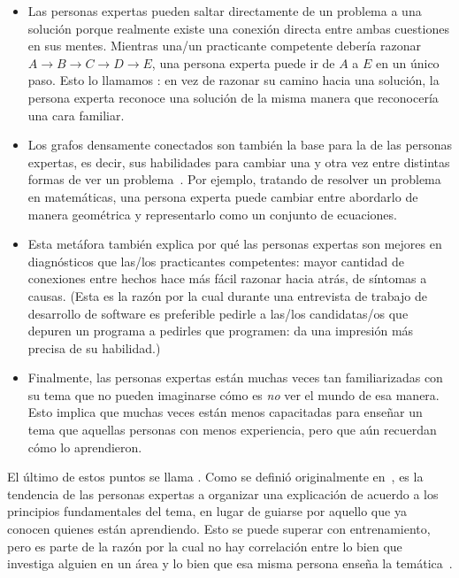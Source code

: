 \begin{itemize}

\item
  Las personas expertas pueden saltar directamente de un problema a una solución
  porque realmente existe una conexión directa entre ambas cuestiones en sus mentes.
  Mientras una/un practicante competente debería razonar
  $A{\rightarrow}B{\rightarrow}C{\rightarrow}D{\rightarrow}E$,
  una persona experta puede ir de $A$ a $E$ en un único paso.
  Esto lo llamamos :
  en vez de razonar su camino hacia una solución,
  la persona experta reconoce una solución de la misma manera que reconocería una cara familiar.

\item
  Los grafos densamente conectados son también la base para la 
   de las personas expertas,
 es decir, sus habilidades para cambiar una y otra vez entre distintas formas de ver un problema~\cite{Petr2016}.
  Por ejemplo,
  tratando de resolver un problema en matemáticas,
  una persona experta puede cambiar entre abordarlo de manera geométrica 
  y representarlo como un conjunto de ecuaciones.

\item
  Esta metáfora también explica por qué las personas expertas son mejores en diagnósticos que las/los practicantes competentes:
 mayor cantidad de conexiones entre hechos hace más fácil razonar hacia atrás, de síntomas a causas.
  (Esta es la razón por la cual durante una entrevista de trabajo de desarrollo de software es preferible pedirle a las/los candidatas/os que depuren un programa a pedirles que programen: da una impresión más precisa de su habilidad.)

\item
  Finalmente,
  las personas expertas están muchas veces tan familiarizadas con su tema que
  no pueden imaginarse cómo es \emph{no} ver el mundo de esa manera.
  Esto implica que muchas veces están menos capacitadas para enseñar un tema que aquellas personas con menos experiencia, 
  pero que aún recuerdan cómo lo aprendieron.

\end{itemize}

El último de estos puntos se llama .
Como se definió originalmente en~\cite{Nath2003},
es la tendencia de las personas expertas a organizar una explicación de acuerdo a los principios fundamentales del tema,
en lugar de guiarse por aquello que ya conocen quienes están aprendiendo.
Esto se puede superar con entrenamiento,
pero es parte de la razón por la cual no hay correlación entre
lo bien que investiga alguien en un área
y lo bien que esa misma persona enseña la temática~\cite{Mars2002}.

